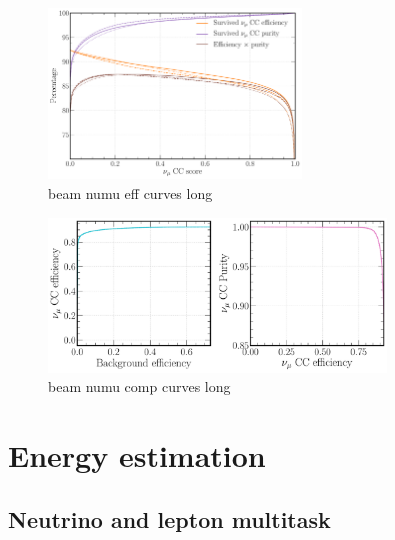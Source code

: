 \begin{figure} %
    \includegraphics[width=0.6\textwidth]{diagrams/7-cvn/chipsnet/beam_numu_eff_curves.pdf}
    \caption[beam numu eff curves short]
    {beam numu eff curves long}
    \label{fig:beam_numu_eff_curves}
\end{figure}

\begin{figure} %
    \includegraphics[width=0.8\textwidth]{diagrams/7-cvn/chipsnet/beam_numu_comp_curves.pdf}
    \caption[beam numu comp curves short]
    {beam numu comp curves long}
    \label{fig:beam_numu_comp_curves}
\end{figure}

\section{Energy estimation} %
\label{sec:cvn_energy} %

\subsection{Neutrino and lepton multitask} %
\label{sec:cvn_energy_chan} %

